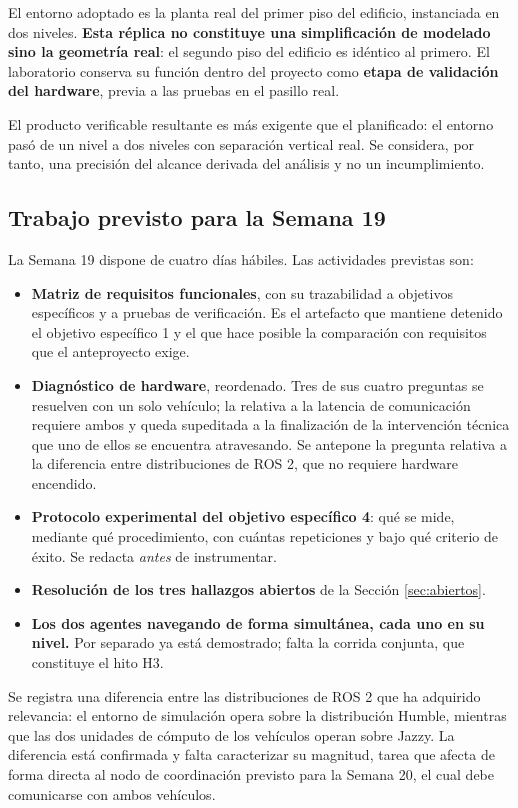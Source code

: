 \documentclass[12pt,letterpaper]{article}
\begin{document}
El entorno adoptado es la planta real del primer piso del edificio, instanciada en dos niveles. \textbf{Esta réplica no constituye una simplificación de modelado sino la geometría real}: el segundo piso del edificio es idéntico al primero. El laboratorio conserva su función dentro del proyecto como \textbf{etapa de validación del hardware}, previa a las pruebas en el pasillo real.

El producto verificable resultante es más exigente que el planificado: el entorno pasó de un nivel a dos niveles con separación vertical real. Se considera, por tanto, una precisión del alcance derivada del análisis y no un incumplimiento.

\subsection{Trabajo previsto para la Semana 19}

La Semana 19 dispone de cuatro días hábiles. Las actividades previstas son:

\begin{itemize}
    \item \textbf{Matriz de requisitos funcionales}, con su trazabilidad a objetivos específicos y a pruebas de verificación. Es el artefacto que mantiene detenido el objetivo específico 1 y el que hace posible la comparación con requisitos que el anteproyecto exige.
    \item \textbf{Diagnóstico de hardware}, reordenado. Tres de sus cuatro preguntas se resuelven con un solo vehículo; la relativa a la latencia de comunicación requiere ambos y queda supeditada a la finalización de la intervención técnica que uno de ellos se encuentra atravesando. Se antepone la pregunta relativa a la diferencia entre distribuciones de ROS 2, que no requiere hardware encendido.
    \item \textbf{Protocolo experimental del objetivo específico 4}: qué se mide, mediante qué procedimiento, con cuántas repeticiones y bajo qué criterio de éxito. Se redacta \emph{antes} de instrumentar.
    \item \textbf{Resolución de los tres hallazgos abiertos} de la Sección \ref{sec:abiertos}.
    \item \textbf{Los dos agentes navegando de forma simultánea, cada uno en su nivel.} Por separado ya está demostrado; falta la corrida conjunta, que constituye el hito H3.
\end{itemize}

Se registra una diferencia entre las distribuciones de ROS 2 que ha adquirido relevancia: el entorno de simulación opera sobre la distribución Humble, mientras que las dos unidades de cómputo de los vehículos operan sobre Jazzy. La diferencia está confirmada y falta caracterizar su magnitud, tarea que afecta de forma directa al nodo de coordinación previsto para la Semana 20, el cual debe comunicarse con ambos vehículos.
\end{document}
